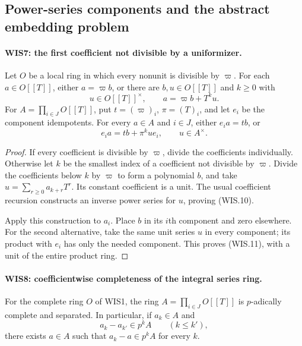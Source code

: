 \documentclass[11pt,a4paper]{article}
\numberwithin{equation}{section}
\theoremstyle{remark}\newtheorem{remark}[theorem]{Remark}
\begin{document}
\subsection{Power-series components and the abstract embedding problem}

\paragraph{WIS7: the first coefficient not divisible by a uniformizer.}
\label{claim:WIS7}
Let $O$ be a local ring in which every nonunit is divisible by
$\varpi$. For each $a\in O[[T]]$, either $a=\varpi b$,
or there are $b,u\in O[[T]]$ and $k\geq0$ with
\[
                    u\in O[[T]]^\times,\qquad
                    a=\varpi b+T^ku.                      \tag{WIS.10}
\]
For $A=\prod_{i\in J}O[[T]]$, put
$t=(\varpi)_i$, $\pi=(T)_i$, and let $e_i$ be the component
idempotents. For every $a\in A$ and $i\in J$, either
$e_i a=tb$, or
\[
                     e_i a=tb+\pi^kue_i,\qquad u\in A^\times.
                                                               \tag{WIS.11}
\]

\begin{proof}
If every coefficient is divisible by $\varpi$, divide
the coefficients individually. Otherwise let $k$ be the
smallest index of a coefficient not divisible by $\varpi$.
Divide the coefficients below $k$ by $\varpi$ to form a
polynomial $b$, and take
$u=\sum_{r\geq0}a_{k+r}T^r$. Its constant coefficient
is a unit. The usual coefficient recursion constructs an
inverse power series for $u$, proving (WIS.10).

Apply this construction to $a_i$. Place $b$ in its $i$th
component and zero elsewhere. For the second alternative,
take the same unit series $u$ in every component; its product
with $e_i$ has only the needed component. This proves
(WIS.11), with a unit of the entire product ring.
\end{proof}

\paragraph{WIS8: coefficientwise completeness of the integral series ring.}
\label{claim:WIS8}
For the complete ring $O$ of WIS1, the ring
$A=\prod_{i\in J}O[[T]]$ is $p$-adically complete and separated.
In particular, if $a_k\in A$ and
\[
           a_k-a_{k'}\in p^kA\qquad(k\leq k'),
                                                               \tag{WIS.12}
\]
there exists $a\in A$ such that $a_k-a\in p^kA$ for every $k$.
\end{document}
